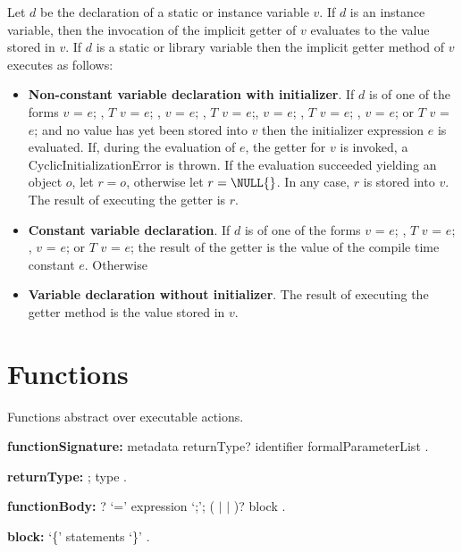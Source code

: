 \documentclass{article}
\newcommand{\code}[1]{{\sf #1}}
\begin{document}
\LMHash{}
Let $d$ be the declaration of a static or instance variable $v$.  If $d$ is an instance variable, then the invocation of the implicit getter  of $v$ evaluates to the value stored in $v$.
If $d$ is a static or library variable then the implicit getter method of $v$ executes as follows:
\begin{itemize}
\item {\bf Non-constant variable declaration with initializer}. If $d$ is of one of the forms \code{\VAR{} $v$ = $e$;} ,  \code{$T$ $v$ = $e$;} ,   \code{\FINAL{} $v$ = $e$;} ,  \code{\FINAL{} $T$ $v$ = $e$;}, \code{\STATIC{} $v$ = $e$; }, \code{\STATIC{} $T$ $v$ = $e$; }, \code{\STATIC{} \FINAL{} $v$ = $e$; } or \code{\STATIC{} \FINAL{} $T$ $v$ = $e$;} and no value has yet been stored into $v$ then the initializer expression $e$ is evaluated. If, during the evaluation of $e$, the getter for $v$ is invoked, a \code{CyclicInitializationError} is thrown. If the evaluation succeeded yielding an object $o$, let $r = o$, otherwise let $r = \NULL{}$. In any case, $r$ is stored into $v$. The result of executing the getter is $r$.
\item  {\bf Constant variable declaration}. If $d$ is of one of the forms \code{\CONST{} $v$ = $e$; } ,  \code{\CONST{} $T$  $v$ = $e$; },  \code{\STATIC{} \CONST{} $v$ = $e$; }  or \code{\STATIC{} \CONST{} $T$ $v$ = $e$;} the result of the getter is the value of the compile time constant $e$. 
Otherwise
\item {\bf Variable declaration without initializer}. The result of executing the getter method is the value stored in $v$.
\end{itemize}





\section{Functions}

\LMHash{}
Functions abstract over executable actions.

\begin{grammar}
{\bf functionSignature:}
    metadata returnType? identifier formalParameterList
    .

{\bf returnType:}
      \VOID{};
      type
    .

{\bf functionBody:} \ASYNC{}?  `={\escapegrammar \gt}' expression `{\escapegrammar ;}';
     (\ASYNC{} $|$ \ASYNC* $|$ \SYNC*)? block
    .

{\bf block:}
      `\{' statements `\}'
    .

\end{grammar}
\end{document}

